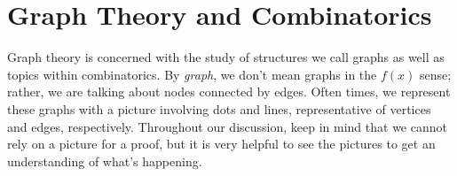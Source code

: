 \chapter{Graph Theory and Combinatorics}

Graph theory is concerned with the study of structures we call graphs as well as topics within combinatorics.
By \textit{graph}, we don't mean graphs in the $f(x)$ sense; rather, we are talking about nodes connected by edges.
Often times, we represent these graphs with a picture involving dots and lines, representative of vertices and edges, respectively.
Throughout our discussion, keep in mind that we cannot rely on a picture for a proof, but it is very helpful to see the pictures to get an understanding of what's happening.




